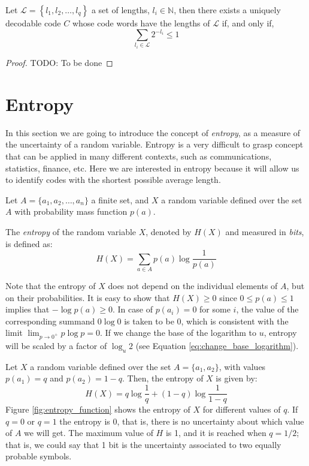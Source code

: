 \begin{theorem}
\label{th:Kraft-Inequality}
Let $\mathcal{L}=\left\{ l_{1},l_{2},\ldots,l_{q}\right\}$ a set of lengths, $l_{i}\in\mathbb{N}$, then there exists a uniquely decodable code $C$ whose code words have the lengths of $\mathcal{L}$ if, and only if,
\[
\sum_{l_{i}\in\mathcal{L}}2^{-l_{i}} \leq 1
\]
\end{theorem}
\begin{proof}
{\color{red} TODO: To be done}
\end{proof}

%
%

\section{Entropy}
\label{sec:Entropy}

In this section we are going to introduce the concept of \emph{entropy}, as a measure of the uncertainty of a random variable. Entropy is a very difficult to grasp concept that can be applied in many different contexts, such as communications, statistics, finance, etc. Here we are interested in entropy because it will allow us to identify codes with the shortest possible average length.

Let $A = \{a_1, a_2, \ldots, a_n\}$ a finite set, and $X$ a random variable defined over the set $A$ with probability mass function $p(a)$.

\begin{definition}[Entropy]
The \emph{entropy} of the random variable $X$, denoted by $H(X)$ and measured in \emph{bits}, is defined as:
\[
H(X) = \sum_{a \in A} p(a) \log \frac{1}{p(a)}
\]
\end{definition}

Note that the entropy of $X$ does not depend on the individual elements of $A$, but on their probabilities. It is easy to show that $H(X) \geq 0$ since $0 \leq p(a) \leq 1$ implies that $-\log p(a) \geq 0$. In case of $p(a_i) = 0$ for some $i$, the value of the corresponding summand $0 \log 0$ is taken to be $0$, which is consistent with the limit $\lim_{p\to 0^+} p \log p = 0$. If we change the base of the logarithm to $u$, entropy will be scaled by a factor of $\log_u 2$ (see Equation \ref{eq:change_base_logarithm}).

\begin{example}
Let $X$ a random variable defined over the set $A = \{a_1, a_2\}$, with values $p(a_1) = q$ and $p(a_2) = 1-q$. Then, the entropy of $X$ is given by:
\[
H(X) = q \log \frac{1}{q} + (1-q) \log \frac{1}{1-q}
\]
Figure \ref{fig:entropy_function} shows the entropy of $X$ for different values of $q$. If $q=0$ or $q=1$ the entropy is 0, that is, there is no uncertainty about which value of $A$ we will get. The maximum value of $H$ is 1, and it is reached when $q=1/2$; that is, we could say that 1 bit is the uncertainty associated to two equally probable symbols.
\end{example}

